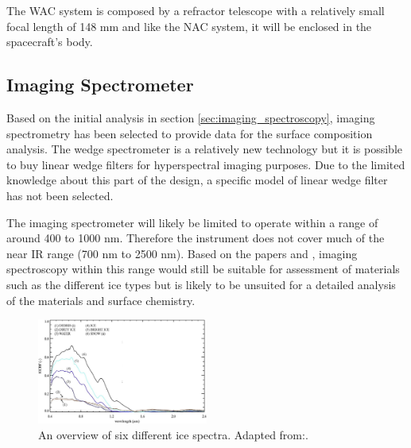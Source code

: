 The WAC system is composed by a refractor telescope with a relatively small focal length of 148 mm and like the NAC system, it will be enclosed in the spacecraft's body.
\subsection{Imaging Spectrometer}
Based on the initial analysis in section \ref{sec:imaging_spectroscopy}, imaging spectrometry has been selected to provide data for the surface composition analysis. The wedge spectrometer is a relatively new technology but it is possible to buy linear wedge filters for hyperspectral imaging purposes. Due to the limited knowledge about this part of the design, a specific model of linear wedge filter has not been selected.

The imaging spectrometer will likely be limited to operate within a range of around 400 to 1000 nm. Therefore the instrument does not cover much of the near IR range (700 nm to 2500 nm). Based on the papers \cite{naegeli2015a} and \cite{negi2015a}, imaging spectroscopy within this range would still be suitable for assessment of materials such as the different ice types but is likely to be unsuited for a detailed analysis of the materials and surface chemistry.

\begin{figure}[htb!]
\centering
\includegraphics[width=0.50\textwidth]{figures/Orbiter/ice_surface_assessment_spectra}
\caption{An overview of six different ice spectra. Adapted from:\cite{naegeli2015a}.}
\label{fig:ice_assessment_spectra}
\end{figure}

